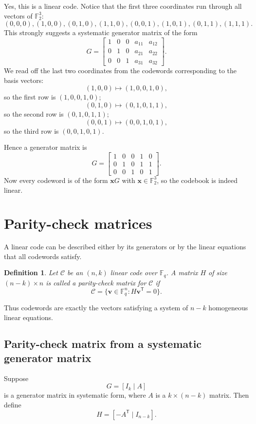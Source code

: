 \documentclass[11pt]{article}
\newtheorem{definition}{Definition}[section]
\newenvironment{solution}{\begin{tcolorbox}[colback=white,colframe=accent!45,title=Solution,boxrule=0.5pt,arc=1.5mm]}{\end{tcolorbox}}
\newcommand{\F}{\mathbb{F}}
\newcommand{\code}{\mathcal{C}}
\newcommand{\vect}[1]{\bm{#1}}
\newcommand{\transpose}{^{\mathsf T}}
\begin{document}
\begin{solution}
Yes, this is a linear code. Notice that the first three coordinates run through all vectors of \(\F_2^3\):
\[
(0,0,0),(1,0,0),(0,1,0),(1,1,0),(0,0,1),(1,0,1),(0,1,1),(1,1,1).
\]
This strongly suggests a systematic generator matrix of the form
\[
G=
\begin{bmatrix}
1&0&0&a_{11}&a_{12}\\
0&1&0&a_{21}&a_{22}\\
0&0&1&a_{31}&a_{32}
\end{bmatrix}.
\]
We read off the last two coordinates from the codewords corresponding to the basis vectors:
\[
(1,0,0)\mapsto (1,0,0,1,0),
\]
so the first row is \((1,0,0,1,0)\);
\[
(0,1,0)\mapsto (0,1,0,1,1),
\]
so the second row is \((0,1,0,1,1)\);
\[
(0,0,1)\mapsto (0,0,1,0,1),
\]
so the third row is \((0,0,1,0,1)\).

Hence a generator matrix is
\[
G=
\begin{bmatrix}
1&0&0&1&0\\
0&1&0&1&1\\
0&0&1&0&1
\end{bmatrix}.
\]
Now every codeword is of the form \(\vect{x}G\) with \(\vect{x}\in\F_2^3\), so the codebook is indeed linear.
\end{solution}

\section{Parity-check matrices}

A linear code can be described either by its generators or by the linear equations that all codewords satisfy.

\begin{definition}
Let \(\code\) be an \((n,k)\) linear code over \(\F_q\). A matrix \(H\) of size \((n-k)\times n\) is called a \emph{parity-check matrix} for \(\code\) if
\[
\code=\{\vect{v}\in \F_q^n : H\vect{v}\transpose=0\}.
\]
\end{definition}

Thus codewords are exactly the vectors satisfying a system of \(n-k\) homogeneous linear equations.

\subsection{Parity-check matrix from a systematic generator matrix}

Suppose
\[
G=[I_k\mid A]
\]
is a generator matrix in systematic form, where \(A\) is a \(k\times (n-k)\) matrix.
Then define
\[
H=[-A\transpose\mid I_{n-k}].
\]
\end{document}
